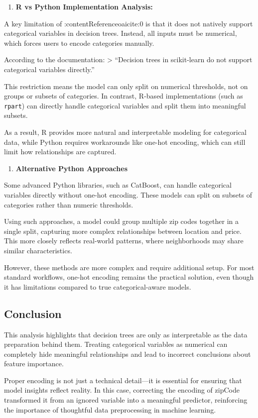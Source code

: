 \documentclass[
  letterpaper,
  DIV=11,
  numbers=noendperiod]{scrartcl}
\providecommand{\tightlist}{%
  \setlength{\itemsep}{0pt}\setlength{\parskip}{0pt}}
\begin{document}
\begin{enumerate}
\def\labelenumi{\arabic{enumi}.}
\setcounter{enumi}{1}
\tightlist
\item
  \textbf{R vs Python Implementation Analysis:}
\end{enumerate}

A key limitation of :contentReference{oaicite:0} is that it does not
natively support categorical variables in decision trees. Instead, all
inputs must be numerical, which forces users to encode categories
manually.

According to the documentation: \textgreater{} ``Decision trees in
scikit-learn do not support categorical variables directly.''

This restriction means the model can only split on numerical thresholds,
not on groups or subsets of categories. In contrast, R-based
implementations (such as \texttt{rpart}) can directly handle categorical
variables and split them into meaningful subsets.

As a result, R provides more natural and interpretable modeling for
categorical data, while Python requires workarounds like one-hot
encoding, which can still limit how relationships are captured.

\begin{enumerate}
\def\labelenumi{\arabic{enumi}.}
\setcounter{enumi}{2}
\tightlist
\item
  \textbf{Alternative Python Approaches}
\end{enumerate}

Some advanced Python libraries, such as CatBoost, can handle categorical
variables directly without one-hot encoding. These models can split on
subsets of categories rather than numeric thresholds.

Using such approaches, a model could group multiple zip codes together
in a single split, capturing more complex relationships between location
and price. This more closely reflects real-world patterns, where
neighborhoods may share similar characteristics.

However, these methods are more complex and require additional setup.
For most standard workflows, one-hot encoding remains the practical
solution, even though it has limitations compared to true
categorical-aware models.

\subsection{Conclusion}\label{conclusion}

This analysis highlights that decision trees are only as interpretable
as the data preparation behind them. Treating categorical variables as
numerical can completely hide meaningful relationships and lead to
incorrect conclusions about feature importance.

Proper encoding is not just a technical detail---it is essential for
ensuring that model insights reflect reality. In this case, correcting
the encoding of zipCode transformed it from an ignored variable into a
meaningful predictor, reinforcing the importance of thoughtful data
preprocessing in machine learning.
\end{document}
